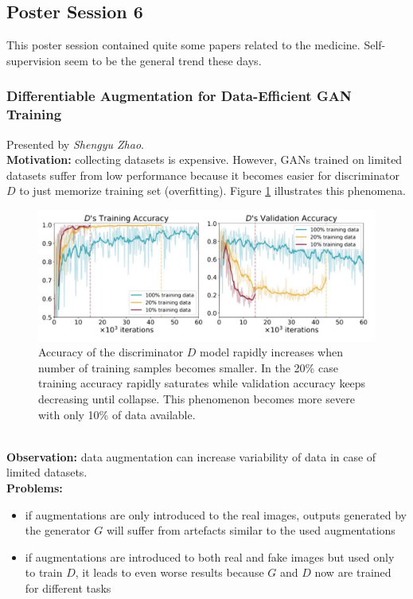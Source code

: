 \subsection{Poster Session 6}

This poster session contained quite some papers related to the medicine.
Self-supervision seem to be the general trend these days.


\spacerule
\subsubsection{Differentiable Augmentation for Data-Efficient GAN Training \cite{ZhaoLLZ020}}

Presented by \textit{Shengyu Zhao}. \\

{\bf Motivation:} collecting datasets is expensive. 
However, GANs trained on limited datasets suffer from low performance because it becomes easier for discriminator $D$ to just memorize training set (overfitting). Figure \ref{fig:gan_overfitting_on_limited_data} illustrates this phenomena. \\

\begin{figure}[h!]
    \centering
    \includegraphics[scale=0.4]{neurips-2020/images/Screenshot 2020-12-11 at 10.29.55.png}
    \caption{Accuracy of the discriminator $D$ model rapidly increases when number of training samples becomes smaller. In the 20\% case training accuracy rapidly saturates while validation accuracy keeps decreasing until collapse. This phenomenon becomes more severe with only 10\% of data available.}
    \label{fig:gan_overfitting_on_limited_data}
\end{figure} \\

{\bf Observation:} data augmentation can increase variability of data in case of limited datasets. \\

{\bf Problems:}
\begin{itemize}
    \item if augmentations are only introduced to the real images, outputs generated by the generator $G$ will suffer from artefacts similar to the used augmentations
    \item if augmentations are introduced to both real and fake images but used only to train $D$, it leads to even worse results because $G$ and $D$ now are trained for different tasks
\end{itemize} \\

